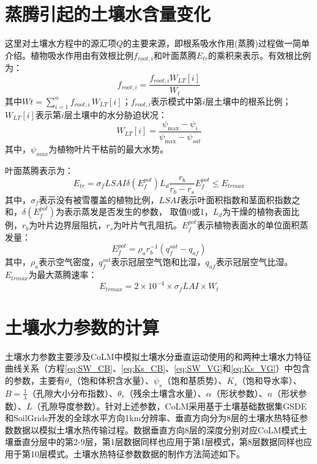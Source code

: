 \section{蒸腾引起的土壤水含量变化}

这里对土壤水方程中的源汇项$Q$的主要来源，即根系吸水作用(蒸腾)过程做一简单介绍。植物吸水作用由有效根比例$f_{root,i}$和叶面蒸腾$E_{tr}$的乘积来表示\citep{dai2003common}。有效根比例为：
\begin{equation}
{f}_{ {root }, {i}}=\frac{{f}_{{root}, {i}} {W}_{{LT}}[{i}]}{W_{t}}
\end{equation}
其中$Wt = \sum_{i=1}^{n}{f_{root,i\ }W_{LT}\left[i\right]}$；$f_{root,i}$表示模式中第$i$层土壤中的根系比例；$W_{LT}[i]$表示第$i$层土壤中的水分胁迫状况：
\begin{equation}
{W}_{{LT}}[{i}]=\frac{\psi_{\max }-\psi_{i}}{\psi_{\max }-\psi_{sat}}
\end{equation}
其中，$\psi_{max}$为植物叶片干枯前的最大水势。

叶面蒸腾表示为：
\begin{equation}
{E}_{{tr}}=\sigma_{{f}} LSAI \delta\left({E}_{{f}}^{{pot}}\right) {L}_{{d}} \frac{{r}_{{b}}}{{r}_{{b}}-{r}_{{s}}} {E}_{{f}}^{{pot}} \leq {E}_{{trmax}}
\end{equation}
其中，$\sigma_f$表示没有被雪覆盖的植物比例，$LSAI$表示叶面积指数和茎面积指数之和，$\delta\left(E_f^{pot}\right)$为表示蒸发是否发生的参数，
取值0或1，$L_d$为干燥的植物表面比例，$r_b$为叶片边界层阻抗，$r_s$为叶片气孔阻抗。$E_f^{pot}$表示植物表面水的单位面积蒸发量：
\begin{equation}
{E}_{{f}}^{{pot}}=\rho_{{a}} {r}_{{b}}^{-1}\left({q}_{{f}}^{{sat}}-{q}_{{af}}\right)
\end{equation}
其中，$\rho_a$表示空气密度，$q_f^{sat}$表示冠层空气饱和比湿，$q_{af}$表示冠层空气比湿。$E_{trmax}$为最大蒸腾速率：
\begin{equation}
{E}_{ {trmax }}=2 \times 10^{-4} \times \sigma_{{f}} L A I \times W_{t}
\end{equation}

\section{土壤水力参数的计算}\label{sec_hydropar}
土壤水力参数主要涉及CoLM中模拟土壤水分垂直运动使用的\citet{campbell1974}和\citet{van1980closed}两种土壤水力特征曲线关系（方程\ref{eq:SW_CB}、\ref{eq:Ks_CB}、\ref{eq:SW_VG}和\ref{eq:Ks_VG}）中包含的参数，主要有$\theta_s$（饱和体积含水量）、$\psi_s$（饱和基质势）、$K_s$（饱和导水率）、$B=\frac{1}{\lambda}$（孔隙大小分布指数）、$\theta_r$（残余土壤含水量）、$\alpha$（形状参数）、$n$（形状参数）、$L$（孔隙导度参数）。针对上述参数，CoLM采用基于土壤基础数据集GSDE和SoilGrids开发的全球水平方向1km分辨率、垂直方向分为8层的土壤水热特征参数数据以模拟土壤水热传输过程。数据垂直方向8层的深度分别对应CoLM模式土壤垂直分层中的第2-9层，第1层数据同样也应用于第1层模式，第8层数据同样也应用于第10层模式。土壤水热特征参数数据的制作方法简述如下。

